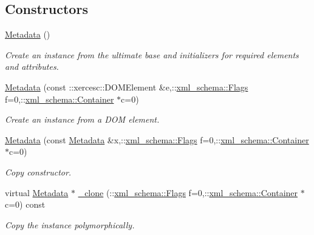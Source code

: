 \subsection*{Constructors}
\begin{DoxyCompactItemize}
\item 
\hypertarget{classopenstack_1_1xml_1_1Metadata_a82914864dbe86b7663ca0ec43b3f2cd2}{
\hyperlink{classopenstack_1_1xml_1_1Metadata_a82914864dbe86b7663ca0ec43b3f2cd2}{Metadata} ()}
\label{classopenstack_1_1xml_1_1Metadata_a82914864dbe86b7663ca0ec43b3f2cd2}

\begin{DoxyCompactList}\small\item\em Create an instance from the ultimate base and initializers for required elements and attributes. \item\end{DoxyCompactList}\item 
\hyperlink{classopenstack_1_1xml_1_1Metadata_a0ee3433a9076fd550397996dcb6ffc22}{Metadata} (const ::xercesc::DOMElement \&e,::\hyperlink{namespacexml__schema_affb4c227cbd9aa7453dd1dc5a1401943}{xml\_\-schema::Flags} f=0,::\hyperlink{namespacexml__schema_a333dea2213742aea47a37532dec4ec27}{xml\_\-schema::Container} $\ast$c=0)
\begin{DoxyCompactList}\small\item\em Create an instance from a DOM element. \item\end{DoxyCompactList}\item 
\hyperlink{classopenstack_1_1xml_1_1Metadata_ac2bd100c5de023456a0dd558832c1345}{Metadata} (const \hyperlink{classopenstack_1_1xml_1_1Metadata}{Metadata} \&x,::\hyperlink{namespacexml__schema_affb4c227cbd9aa7453dd1dc5a1401943}{xml\_\-schema::Flags} f=0,::\hyperlink{namespacexml__schema_a333dea2213742aea47a37532dec4ec27}{xml\_\-schema::Container} $\ast$c=0)
\begin{DoxyCompactList}\small\item\em Copy constructor. \item\end{DoxyCompactList}\item 
virtual \hyperlink{classopenstack_1_1xml_1_1Metadata}{Metadata} $\ast$ \hyperlink{classopenstack_1_1xml_1_1Metadata_abc88eed9bbfad857998957fdc0c13d1c}{\_\-clone} (::\hyperlink{namespacexml__schema_affb4c227cbd9aa7453dd1dc5a1401943}{xml\_\-schema::Flags} f=0,::\hyperlink{namespacexml__schema_a333dea2213742aea47a37532dec4ec27}{xml\_\-schema::Container} $\ast$c=0) const 
\begin{DoxyCompactList}\small\item\em Copy the instance polymorphically. \item\end{DoxyCompactList}\end{DoxyCompactItemize}


